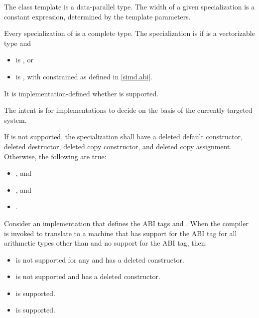 \pnum
The class template  is a data-parallel type. The width of a given  specialization is a constant expression, determined by the template parameters.


\pnum
Every specialization of  is a complete type.
The specialization  is  if  is a vectorizable type and
\begin{itemize}
  \item {} is , or
  \item {} is , with  constrained as defined in \ref{simd.abi}.
\end{itemize}

It is implementation-defined whether  is supported.
\begin{note}
The intent is for implementations to decide on the basis of the currently
targeted system.
\end{note}

If  is not supported, the specialization shall have a deleted default constructor, deleted destructor, deleted copy constructor, and deleted copy assignment.
Otherwise, the following are true:
\begin{itemize}
  \item {}, and
  \item {}, and
  \item {}.
\end{itemize}

\begin{example}
  Consider an implementation that defines the ABI tags  and . When the compiler is invoked to translate to a machine that has support for the  ABI tag for all arithmetic types other than  and no support for the  ABI tag, then:
  \begin{itemize}
    \item {} is not supported for any  and has a deleted constructor.
    \item {} is not supported and has a deleted constructor.
    \item {} is supported.
    \item {} is supported.
  \end{itemize}
\end{example}

